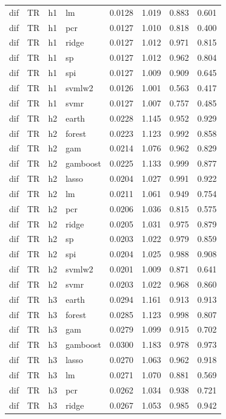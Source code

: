 \begin{ThreePartTable}
\begin{longtable}[t]{llclcccc}
dif & TR & h1 & lm & 0.0128 & 1.019 & 0.883 & 0.601\\
dif & TR & h1 & pcr & 0.0127 & 1.010 & 0.818 & 0.400\\
dif & TR & h1 & ridge & 0.0127 & 1.012 & 0.971 & 0.815\\
dif & TR & h1 & sp & 0.0127 & 1.012 & 0.962 & 0.804\\
dif & TR & h1 & spi & 0.0127 & 1.009 & 0.909 & 0.645\\
dif & TR & h1 & svmlw2 & 0.0126 & 1.001 & 0.563 & 0.417\\
dif & TR & h1 & svmr & 0.0127 & 1.007 & 0.757 & 0.485\\
\addlinespace
dif & TR & h2 & earth & 0.0228 & 1.145 & 0.952 & 0.929\\
dif & TR & h2 & forest & 0.0223 & 1.123 & 0.992 & 0.858\\
dif & TR & h2 & gam & 0.0214 & 1.076 & 0.962 & 0.829\\
dif & TR & h2 & gamboost & 0.0225 & 1.133 & 0.999 & 0.877\\
dif & TR & h2 & lasso & 0.0204 & 1.027 & 0.991 & 0.922\\
dif & TR & h2 & lm & 0.0211 & 1.061 & 0.949 & 0.754\\
dif & TR & h2 & pcr & 0.0206 & 1.036 & 0.815 & 0.575\\
dif & TR & h2 & ridge & 0.0205 & 1.031 & 0.975 & 0.879\\
dif & TR & h2 & sp & 0.0203 & 1.022 & 0.979 & 0.859\\
dif & TR & h2 & spi & 0.0204 & 1.025 & 0.988 & 0.908\\
dif & TR & h2 & svmlw2 & 0.0201 & 1.009 & 0.871 & 0.641\\
dif & TR & h2 & svmr & 0.0203 & 1.022 & 0.968 & 0.860\\
\addlinespace
dif & TR & h3 & earth & 0.0294 & 1.161 & 0.913 & 0.913\\
dif & TR & h3 & forest & 0.0285 & 1.123 & 0.998 & 0.807\\
dif & TR & h3 & gam & 0.0279 & 1.099 & 0.915 & 0.702\\
dif & TR & h3 & gamboost & 0.0300 & 1.183 & 0.978 & 0.973\\
dif & TR & h3 & lasso & 0.0270 & 1.063 & 0.962 & 0.918\\
dif & TR & h3 & lm & 0.0271 & 1.070 & 0.881 & 0.569\\
dif & TR & h3 & pcr & 0.0262 & 1.034 & 0.938 & 0.721\\
dif & TR & h3 & ridge & 0.0267 & 1.053 & 0.985 & 0.942\\

\end{longtable}
\end{ThreePartTable}
